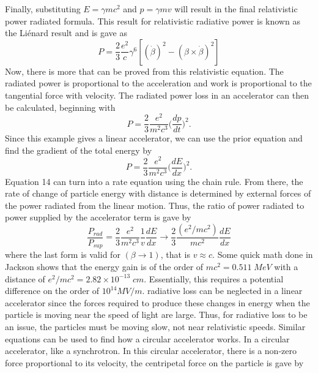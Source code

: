 \documentclass[a4paper]{article}
\begin{document}
Finally, substituting $E = \gamma m c^{2}$ and $p = \gamma m v$ will result in the final relativistic power radiated formula. This result for relativistic radiative power is known as the Liénard result and is gave as
\begin{equation}
    P = \frac{2}{3} \frac{e^{2}}{c} \gamma^{6} [(\dot{\beta})^{2} - (\beta \times \dot{\beta})^{2}]
\end{equation}
Now, there is more that can be proved from this relativistic equation. The radiated power is proportional to the acceleration and work is proportional to the tangential force with velocity. The radiated power loss in an accelerator can then be calculated, beginning with
\begin{equation}
    P = \frac{2}{3}\frac{e^{2}}{m^{2} c^{3}} \Bigg(\frac{dp}{dt}\Bigg)^{2}.
\end{equation}
Since this example gives a linear accelerator, we can use the prior equation and find the gradient of the total energy by
\begin{equation}
        P = \frac{2}{3}\frac{e^{2}}{m^{2} c^{3}} \Bigg(\frac{dE}{dx}\Bigg)^{2}.
\end{equation}
Equation 14 can turn into a rate equation using the chain rule. From there, the rate of change of particle energy with distance is determined by external forces of the power radiated from the linear motion. Thus, the ratio of power radiated to power supplied by the accelerator term is gave by
\begin{equation}
    \frac{P_{rad}}{P_{sup}} = \frac{2}{3} \frac{e^{2}}{m^{2}c^{3}} \frac{1}{v} \frac{dE}{dx} \rightarrow \frac{2}{3}\frac{(e^{2}/mc^{2})}{mc^{2}} \frac{dE}{dx}
\end{equation}
where the last form is valid for $(\beta \rightarrow 1)$, that is $v \approx c$. Some quick math done in Jackson shows that the energy gain is of the order of $mc^{2} = 0.511 \; MeV$ with a distance of $e^{2}/mc^{2} = 2.82 \times 10^{-13} \; cm$. Essentially, this requires a potential difference on the order of $10^{14} MV/m$. radiative loss can be neglected in a linear accelerator since the forces required to produce these changes in energy when the particle is moving near the speed of light are large. Thus, for radiative loss to be an issue, the particles must be moving slow, not near relativistic speeds.
Similar equations can be used to find how a circular accelerator works. In a circular accelerator, like a synchrotron. In this circular accelerator, there is a non-zero force proportional to its velocity, the centripetal force on the particle is gave by
\end{document}
